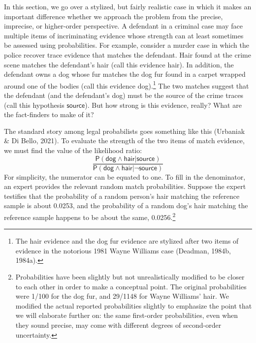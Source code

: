 \documentclass[
  10pt,
  dvipsnames,enabledeprecatedfontcommands]{scrartcl}
\newcommand{\pr}[1]{\mathsf{P}(#1)}
\newcommand{\s}[1]{\mbox{$\mathsf{#1}$}}
\begin{document}
In this section, we go over a stylized, but fairly realistic case in
which it makes an important difference whether we approach the problem
from the precise, imprecise, or higher-order perspective. A defendant in
a criminal case may face multiple items of incriminating evidence whose
strength can at least sometimes be assessed using probabilities. For
example, consider a murder case in which the police recover trace
evidence that matches the defendant. Hair found at the crime scene
matches the defendant's hair (call this evidence \textsf{hair}). In
addition, the defendant owns a dog whose fur matches the dog fur found
in a carpet wrapped around one of the bodies (call this evidence
\textsf{dog}).\footnote{The hair evidence and the dog fur evidence are
  stylized after two items of evidence in the notorious 1981 Wayne
  Williams case (Deadman, 1984b, 1984a).} The two matches suggest that
the defendant (and the defendant's dog) must be the source of the crime
traces (call this hypothesis \(\mathsf{source}\)). But how strong is
this evidence, really? What are the fact-finders to make of it?

The standard story among legal probabilists goes something like this
(Urbaniak \& Di Bello, 2021). To evaluate the strength of the two items
of match evidence, we must find the value of the likelihood ratio:
\[\frac{\pr{\s{dog}\wedge \s{hair} \vert \s{source}}}{\pr{\s{dog}\wedge \s{hair} \vert \neg \s{source}}}\]
For simplicity, the numerator can be equated to one. To fill in the
denominator, an expert provides the relevant random match probabilities.
Suppose the expert testifies that the probability of a random person's
hair matching the reference sample is about 0.0253, and the probability
of a random dog's hair matching the reference sample happens to be about
the same, 0.0256.\footnote{Probabilities have been slightly but not
  unrealistically modified to be closer to each other in order to make a
  conceptual point. The original probabilities were 1/100 for the dog
  fur, and 29/1148 for Wayne Williams' hair. We modified the actual
  reported probabilities slightly to emphasize the point that we will
  elaborate further on: the same first-order probabilities, even when
  they sound precise, may come with different degrees of second-order
  uncertainty.}
\end{document}
